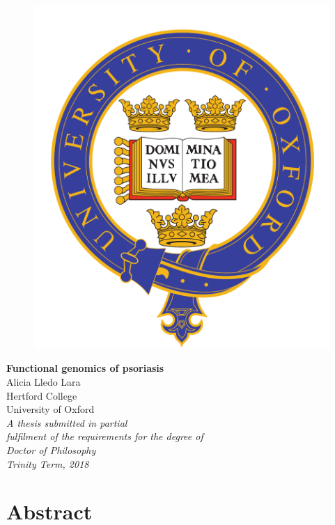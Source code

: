 \begin{titlepage}
   \centering
   \begin{figure}
      \centering
      \includegraphics[scale=0.4]{oxford_logo-eps-converted-to.pdf}
   \end{figure}
   {\LARGE{\textbf{Functional genomics of psoriasis}}}\\ 
    \vspace{2cm}
   {\Large{Alicia Lledo Lara}}\\
   {\Large{Hertford College}}\\
   {\Large{University of Oxford}}\\
   \vspace{2cm}   
   {\Large{\textit{A thesis submitted in partial \\ fulfilment of the requirements for the degree of\\ Doctor of Philosophy}}}\\
   {\Large{\textit{Trinity Term, 2018}}}
\end{titlepage}

\newpage
\chapter*{Abstract} %
\thispagestyle{plain}
 \setcounter{page}{1}

